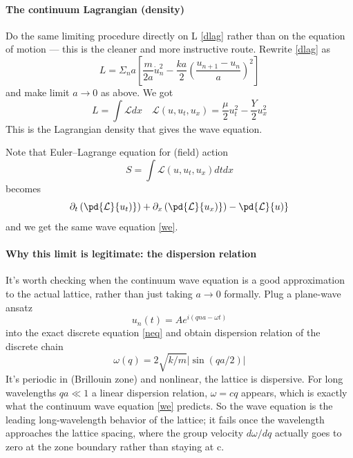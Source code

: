 \paragraph{The continuum Lagrangian (density)}
Do the same limiting procedure directly on L \eqref{dlag} rather than on the 
equation of motion — this is the cleaner and more instructive route.
Rewrite \eqref{dlag} as
\begin{equation}
   \label {dlag1}
    L=\Sigma_n a \left[\frac{m}{2 a}{\dot u}_n^2-\frac{ka}{2}(\frac{u_{n+1}-u_n}{a})^2 \right]
\end{equation}
and make limit $ a\to 0 $ as above.
We got 
\begin{equation}
   \label {lag}
    L=\int \mathcal{L} dx \quad \mathcal{L}(u,u_t,u_x)=\frac{\mu}{2}u_t^2-\frac{Y}{2}u_x^2
\end{equation}
This is the Lagrangian density that gives the wave equation. 

Note that Euler–Lagrange equation for (field) action 
\begin{equation}
   \label {fac}
   S=\int \mathcal{L}(u,u_t,u_x) dt dx
\end{equation}
becomes
\begin{equation}
   \label {ELe}
    \partial_t \left(\pd{\mathcal{L}}{u_t)}\right)+ 
    \partial_x \left(\pd{\mathcal{L}}{u_x)}\right)-
    \pd{\mathcal{L}}{u)}
\end{equation}
and we get the same wave equation \eqref{we}.

\paragraph{Why this limit is legitimate: the dispersion relation}
It's worth checking when the continuum wave equation is a good approximation
to the actual lattice, rather than just taking $a \to 0$ formally. 
Plug a plane-wave ansatz 
\begin{equation}
   \label {anz}
    u_n(t)=Ae^{i(qna-\omega t)}
\end{equation}
into the exact discrete equation \eqref{neq}
and obtain  dispersion relation of the discrete chain 
\begin{equation}
   \label {dsol}
    \omega(q)=2 \sqrt{k/m}|\sin(qa/2)|
\end{equation}
It's periodic in  (Brillouin zone) and nonlinear, 
the lattice is dispersive.
For long wavelengths $ qa \ll 1 $ 
a linear dispersion relation, $ \omega=c q $ appears,
which is exactly what the continuum wave equation \eqref{we} predicts.
 So the wave equation is the leading long-wavelength behavior of the lattice;
 it fails once the wavelength approaches the lattice spacing, where the group 
 velocity $ d \omega /d q $ actually goes to zero at the zone boundary rather 
 than staying at c.

